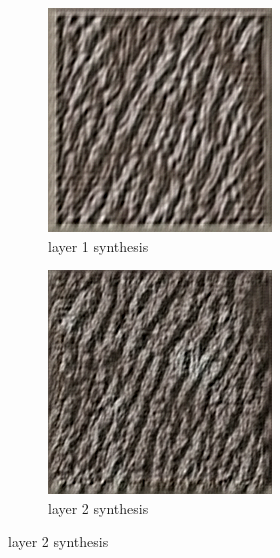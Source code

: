 \documentclass[11pt, oneside]{article}   	%
\begin{document}
\begin{figure}[H]
    \centering
    \begin{subfigure}[b]{0.45\textwidth}
        \includegraphics[width=\textwidth]{figure/bark/layer_01_001}
        \caption{layer 1 synthesis}
    \end{subfigure}
    \begin{subfigure}[b]{0.45\textwidth}
        \includegraphics[width=\textwidth]{figure/bark/layer_02_001}
        \caption{layer 2 synthesis}
    \end{subfigure}
    

\end{figure}
\end{document}
